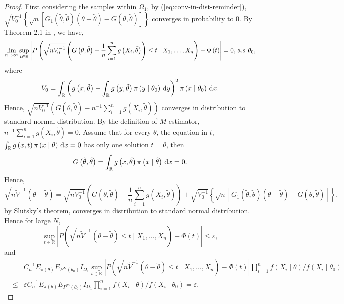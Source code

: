 \begin{proof}
First considering the samples within $\Omega_{1}$, by (\ref{eq:conv-in-dist-reminder}),
$\sqrt{V_{0}^{-1}}\left\{ \sqrt{n}\left[G_{1}\left(\tilde{\theta},\tilde{\theta}\right)\left(\theta-\tilde{\theta}\right)-G\left(\theta,\tilde{\theta}\right)\right]\right\} $
converges in probability to 0. By Theorem 2.1 in \citet{rivoirard2012bernstein},
we have, 
\begin{equation}
\lim_{n\rightarrow\infty}\sup_{t\in\mathbb{R}}\left|P\left(\sqrt{nV_{0}^{-1}}\left(G\left(\theta,\tilde{\theta}\right)-\frac{1}{n}\sum_{i=1}^{n}g\left(X_{i},\tilde{\theta}\right)\right)\le t\mid X_{1},\ldots,X_{n}\right)-\Phi\left(t\right)\right|=0,\,\mathrm{a.s.}\,\theta_{0},\label{eq:conv-in-dist-est-eq}
\end{equation}
where 
\[
V_{0}=\int_{\mathbb{R}}\left(g\left(x,\tilde{\theta}\right)-\int_{\mathbb{R}}g\left(y,\tilde{\theta}\right)\pi\left(y\mid\theta_{0}\right)\,\mathrm{d} y\right)^{2}\pi\left(x\mid\theta_{0}\right)\,\mathrm{d} x.
\]
Hence, $\sqrt{nV_{0}^{-1}}\left(G\left(\theta,\tilde{\theta}\right)-n^{-1}\sum_{i=1}^{n}g\left(X_{i},\tilde{\theta}\right)\right)$
converges in distribution to standard normal distribution. By the
definition of $M$-estimator, $n^{-1}\sum_{i=1}^{n}g\left(X_{i},\tilde{\theta}\right)=0$.
Assume that for every $\theta$, the equation in $t$, $\int_{\mathbb{R}}g\left(x,t\right)\pi\left(x\mid\theta\right)\,\mathrm{d} x=0$
has only one solution $t=\theta$, then 
\[
G\left(\tilde{\theta},\tilde{\theta}\right)=\int_{\mathbb{R}}g\left(x,\tilde{\theta}\right)\pi\left(x\mid\tilde{\theta}\right)\,\mathrm{d} x=0.
\]
Hence,
\[
\sqrt{n\tilde{V}^{-1}}\left(\theta-\tilde{\theta}\right)=\sqrt{nV_{0}^{-1}}\left(G\left(\theta,\tilde{\theta}\right)-\frac{1}{n}\sum_{i=1}^{n}g\left(X_{i},\tilde{\theta}\right)\right)+\sqrt{V_{0}^{-1}}\left\{ \sqrt{n}\left[G_{1}\left(\tilde{\theta},\tilde{\theta}\right)\left(\theta-\tilde{\theta}\right)-G\left(\theta,\tilde{\theta}\right)\right]\right\} ,
\]
by Slutsky's theorem, converges in distribution to standard normal
distribution. Hence for large $N$, 
\[
\sup_{t\in\mathbb{R}}\left|P\left(\sqrt{n\tilde{V}^{-1}}\left(\theta-\tilde{\theta}\right)\le t\mid X_{1},\ldots,X_{n}\right)-\Phi\left(t\right)\right|\le\varepsilon,
\]
and 
\begin{eqnarray}
 &  & C_{n}^{-1}E_{\pi\left(\theta\right)}E_{P^{\infty}\left(\theta_{0}\right)}I_{\Omega_{1}}\sup_{t\in\mathbb{R}}\left|P\left(\sqrt{n\tilde{V}^{-1}}\left(\theta-\tilde{\theta}\right)\le t\mid X_{1},\ldots,X_{n}\right)-\Phi\left(t\right)\right|\prod_{i=1}^{n}f\left(X_{i}\mid\theta\right)/f\left(X_{i}\mid\theta_{0}\right)\nonumber \\
 & \le & \varepsilon C_{n}^{-1}E_{\pi\left(\theta\right)}E_{P^{\infty}\left(\theta_{0}\right)}I_{\Omega_{1}}\prod_{i=1}^{n}f\left(X_{i}\mid\theta\right)/f\left(X_{i}\mid\theta_{0}\right)=\varepsilon.\label{eq:conv-with-omega1}
\end{eqnarray}



\end{proof}
